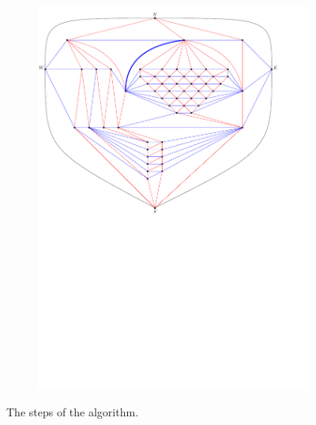 \begin{figure}
    \ContinuedFloat
    \begin{subfigure}[b]{.9 \textwidth}
      \includegraphics[width=\textwidth]{examples/img/vertWorstCase/subdivfinal}
      \caption{}
      \label{fig:ex:vert:subdivfinal}
    \end{subfigure}
  \caption{The steps of the algorithm.}
  \label{}
\end{figure}
